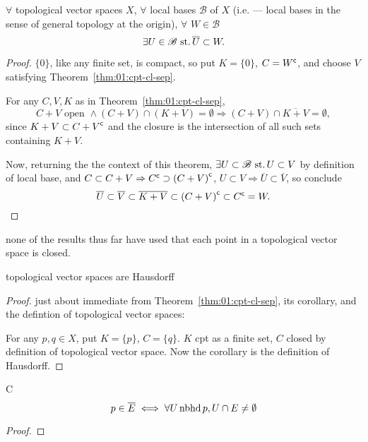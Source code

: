 \begin{thm}
  $\forall$ topological vector spaces $X$,
  $\forall$ local bases $\mathscr B$ of $X$
  (i.e. --- local bases in the sense of general topology
  at the origin),
  $\forall$ $W\in\mathscr B$
  \[ \exists U\in\mathscr B \operatorname{\,st.} \overline U \subset W .\]
\end{thm}
\begin{proof}
  $\{0\}$, like any finite set, is compact,
  so put $K=\{0\}$, $C={W}^{\mathsf{c}}$,
  and choose $V$ satisfying Theorem~\ref{thm:01:cpt-cl-sep}.

  For any $C, V, K$ as in Theorem~\ref{thm:01:cpt-cl-sep},
  \[
  C+V\text{ open }\land (C+V)\cap(K+V)=\emptyset
  \Rightarrow
  (C+V)\cap\overline{K+V}=\emptyset,
  \]
  since $K+V\subset{C+V}^{\mathsf{c}}$ and the closure is the
  intersection of all such sets containing $K+V$.

  Now, returning the the context of this theorem,
  $\exists U\subset\mathscr B\operatorname{\,st.} U\subset V$
  by definition of local base, and
  $C\subset C+V\Rightarrow {C}^{\mathsf{c}}\supset{(C+V)}^{\mathsf{c}}$,
  $U\subset V\Rightarrow \overline{U} \subset \overline{V}$,
  so conclude
  \[
  \overline{U} \subset \overline{V}
  \subset \overline{K+V} \subset {(C+V)}^{\mathsf{c}}
  \subset {C}^{\mathsf{c}} = W.
  \]
\end{proof}

\begin{rem}{}
  none of the results thus far have used that each point
  in a topological vector space is closed.
\end{rem}

\begin{thm}\label{thm:01:tvs-haus}
  topological vector spaces are Hausdorff
\end{thm}
\begin{proof}
  just about immediate from Theorem~\ref{thm:01:cpt-cl-sep},
  its corollary,
  and the defintion of topological vector spaces:

  For any $p, q\in X$, put $K=\{p\}$, $C=\{q\}$.
  $K$ cpt as a finite set, $C$ closed by definition
  of topological vector space.
  Now the corollary is the definition of Hausdorff.
\end{proof}


\begin{rem}{C}\label{rem:01:closure-open-char}
  \[
  p \in \overline{E} \iff
  \forall U \operatorname{nbhd} p, U\cap E\neq\emptyset
  \]
\end{rem}
\begin{proof}
\end{proof}

